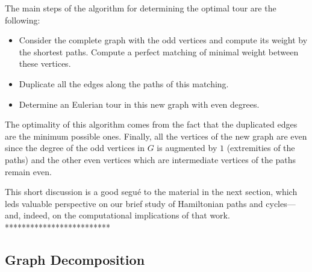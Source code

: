 {The main steps of the algorithm for determining the optimal tour are the following:

\begin{itemize}
\item Consider the complete graph with the odd vertices and compute its weight by the shortest paths.
Compute a perfect matching of minimal weight between these vertices. 
\item Duplicate all the edges along the paths of this matching.
\item Determine an Eulerian tour in this new graph with even degrees.
\end{itemize}

The optimality of this algorithm comes from the fact that the duplicated edges are the minimum possible ones.
Finally, all the vertices of the new graph are even since the degree of the odd vertices in $G$ is augmented by $1$
(extremities of the paths) and the other even vertices which are intermediate vertices of the paths remain even. 

\medskip

This short discussion is a good segu\'{e} to the material in the next
section, which leds valuable perspective on our brief study of
Hamiltonian paths and cycles---and, indeed, on the computational
implications of that work.
*************************}

\subsection{Graph Decomposition}
\label{sec:graph-decompose}

